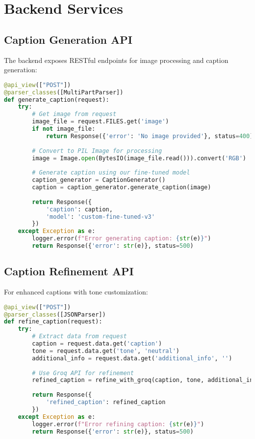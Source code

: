 \documentclass[12pt,a4paper]{report}
\begin{document}
\section{Backend Services}
\subsection{Caption Generation API}
The backend exposes RESTful endpoints for image processing and caption generation:

\begin{lstlisting}[language=python, caption=Caption Generation API]
@api_view(["POST"])
@parser_classes([MultiPartParser])
def generate_caption(request):
    try:
        # Get image from request
        image_file = request.FILES.get('image')
        if not image_file:
            return Response({'error': 'No image provided'}, status=400)
            
        # Convert to PIL Image for processing
        image = Image.open(BytesIO(image_file.read())).convert('RGB')
        
        # Generate caption using our fine-tuned model
        caption_generator = CaptionGenerator()
        caption = caption_generator.generate_caption(image)
        
        return Response({
            'caption': caption,
            'model': 'custom-fine-tuned-v3'
        })
    except Exception as e:
        logger.error(f"Error generating caption: {str(e)}")
        return Response({'error': str(e)}, status=500)
\end{lstlisting}

\subsection{Caption Refinement API}
For enhanced captions with tone customization:

\begin{lstlisting}[language=python, caption=Caption Refinement API]
@api_view(["POST"])
@parser_classes([JSONParser])
def refine_caption(request):
    try:
        # Extract data from request
        caption = request.data.get('caption')
        tone = request.data.get('tone', 'neutral')
        additional_info = request.data.get('additional_info', '')
        
        # Use Groq API for refinement
        refined_caption = refine_with_groq(caption, tone, additional_info)
        
        return Response({
            'refined_caption': refined_caption
        })
    except Exception as e:
        logger.error(f"Error refining caption: {str(e)}")
        return Response({'error': str(e)}, status=500)
\end{lstlisting}
\end{document}
